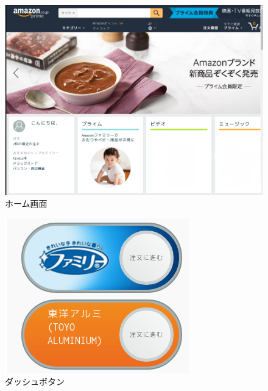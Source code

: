 \documentclass{scrartcl}
\begin{document}
\begin{figure}[htbp]
\centering
\includegraphics[width=0.5\linewidth]{./Screenshot1.png}
\caption{ホーム画面}
\end{figure}

\begin{figure}[htbp]
\centering
\includegraphics[width=0.5\linewidth]{./Screenshot2.png}
\caption{ダッシュボタン}
\end{figure}
\end{document}
